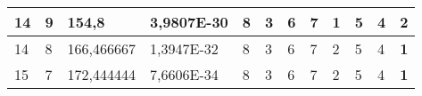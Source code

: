 \documentclass[conference]{IEEEtran}
\begin{document}
\begin{table*}[]
\begin{tabular}{|llll|llllllll|}
\multicolumn{1}{|l|}{14}                                                    & \multicolumn{1}{l|}{9}                                                        & \multicolumn{1}{l|}{154,8}                                                        & 3,9807E-30                     & \multicolumn{1}{l|}{8}                                                  & \multicolumn{1}{l|}{3}                                                  & \multicolumn{1}{l|}{6}                                                  & \multicolumn{1}{l|}{7}                                                  & \multicolumn{1}{l|}{\textbf{1}}                                         & \multicolumn{1}{l|}{5}                                                  & \multicolumn{1}{l|}{4}                                                  & 2                          \\ \hline
\multicolumn{1}{|l|}{14}                                                    & \multicolumn{1}{l|}{8}                                                        & \multicolumn{1}{l|}{166,466667}                                                   & 1,3947E-32                     & \multicolumn{1}{l|}{8}                                                  & \multicolumn{1}{l|}{3}                                                  & \multicolumn{1}{l|}{6}                                                  & \multicolumn{1}{l|}{7}                                                  & \multicolumn{1}{l|}{2}                                                  & \multicolumn{1}{l|}{5}                                                  & \multicolumn{1}{l|}{4}                                                  & \textbf{1}                 \\ \hline
\multicolumn{1}{|l|}{15}                                                    & \multicolumn{1}{l|}{7}                                                        & \multicolumn{1}{l|}{172,444444}                                                   & 7,6606E-34                     & \multicolumn{1}{l|}{8}                                                  & \multicolumn{1}{l|}{3}                                                  & \multicolumn{1}{l|}{6}                                                  & \multicolumn{1}{l|}{7}                                                  & \multicolumn{1}{l|}{2}                                                  & \multicolumn{1}{l|}{5}                                                  & \multicolumn{1}{l|}{4}                                                  & \textbf{1}                 \\ \hline

\end{tabular}
\end{table*}
\end{document}
